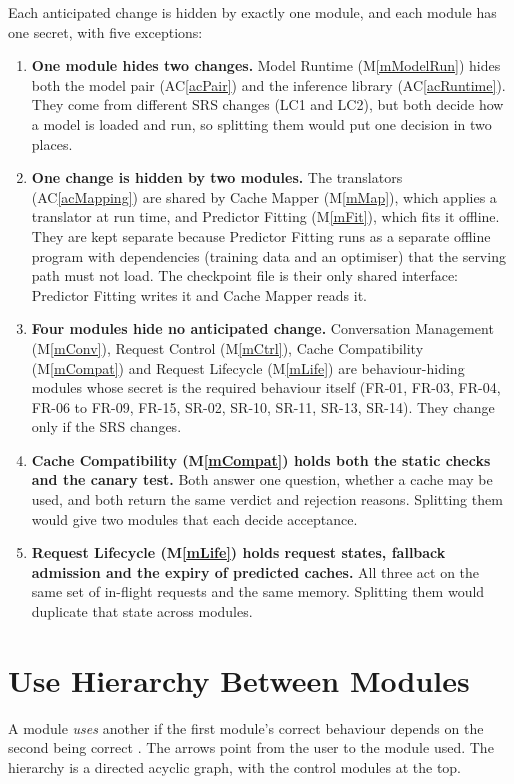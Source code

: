 \documentclass[12pt, titlepage]{article}
\newcommand{\acref}[1]{AC\ref{#1}}
\newcommand{\mref}[1]{M\ref{#1}}
\begin{document}
Each anticipated change is hidden by exactly one module, and each module has one
secret, with five exceptions:

\begin{enumerate}
\item \textbf{One module hides two changes.} Model Runtime (\mref{mModelRun})
  hides both the model pair (\acref{acPair}) and the inference library
  (\acref{acRuntime}). They come from different SRS changes (LC1 and LC2), but
  both decide how a model is loaded and run, so splitting them would put one
  decision in two places.
\item \textbf{One change is hidden by two modules.} The translators
  (\acref{acMapping}) are shared by Cache Mapper (\mref{mMap}), which applies a
  translator at run time, and Predictor Fitting (\mref{mFit}), which fits it
  offline. They are kept separate because Predictor Fitting runs as a separate
  offline program with dependencies (training data and an optimiser) that the
  serving path must not load. The checkpoint file is their only shared
  interface: Predictor Fitting writes it and Cache Mapper reads it.
\item \textbf{Four modules hide no anticipated change.} Conversation Management
  (\mref{mConv}), Request Control (\mref{mCtrl}), Cache Compatibility
  (\mref{mCompat}) and Request Lifecycle (\mref{mLife}) are behaviour-hiding
  modules whose secret is the required behaviour itself (FR-01, FR-03, FR-04,
  FR-06 to FR-09, FR-15, SR-02, SR-10, SR-11, SR-13, SR-14). They change only
  if the SRS changes.
\item \textbf{Cache Compatibility (\mref{mCompat}) holds both the static checks
  and the canary test.} Both answer one question, whether a cache may be used,
  and both return the same verdict and rejection reasons. Splitting them would
  give two modules that each decide acceptance.
\item \textbf{Request Lifecycle (\mref{mLife}) holds request states, fallback
  admission and the expiry of predicted caches.} All three act on the same set of
  in-flight requests and the same memory. Splitting them would duplicate that
  state across modules.
\end{enumerate}

\section{Use Hierarchy Between Modules} \label{SecUse}

A module \emph{uses} another if the first module's correct behaviour depends on
the second being correct \citep{Parnas1978}. The arrows point from the user to
the module used. The hierarchy is a directed acyclic graph, with the control
modules at the top.
\end{document}
